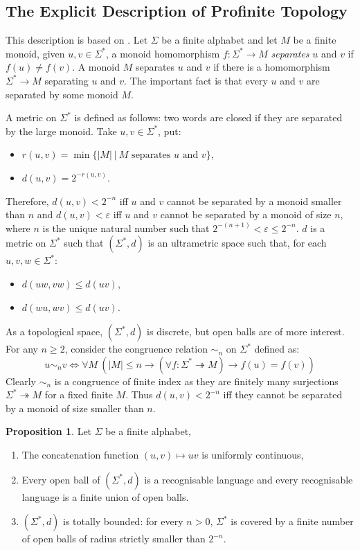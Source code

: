 \documentclass[8pt]{article}
\theoremstyle{definition}
\theoremstyle{definition}
\theoremstyle{definition}
\theoremstyle{definition}
\theoremstyle{definition}
\theoremstyle{definition}
\theoremstyle{definition}
\newtheorem{prop}{Proposition}[section]
\theoremstyle{definition}
\theoremstyle{definition}
\theoremstyle{definition}
\theoremstyle{definition}
\theoremstyle{definition}
\theoremstyle{definition}
\theoremstyle{definition}
\theoremstyle{question}
\begin{document}
\subsection{The Explicit Description of Profinite Topology}

This description is based on \cite[C.X.2]{pin2010mathematical}. Let $\Sigma$ be
a finite alphabet and let $M$ be a finite monoid, given $u, v \in \Sigma^*$,
a monoid homomorphism $f : \Sigma^* \to M$ \emph{separates} $u$ and $v$ if $f(u) \neq f(v)$. A monoid
$M$ separates $u$ and $v$ if there is a homomorphism $\Sigma^* \to M$ separating $u$ and $v$. The important 
fact is that every $u$ and $v$ are separated by some monoid $M$. 

A metric on $\Sigma^*$ is defined as follows: two words are closed if they are separated by the large monoid.
Take $u, v \in \Sigma^*$, put:
\begin{itemize}
  \item $r(u,v) = \min \{ |M| \: | \: \text{$M$ separates $u$ and $v$}\}$,
  \item $d(u, v) = 2^{-r(u,v)}$.
\end{itemize}
Therefore, $d(u,v) < 2^{-n}$ iff $u$ and $v$ cannot be separated by a monoid smaller than $n$
and $d(u,v) < \varepsilon$ iff $u$ and $v$ cannot be separated by a monoid of size $n$,
where $n$ is the unique natural number such that $2^{-(n+1)} < \varepsilon \leq 2^{-n}$.
$d$ is a metric on $\Sigma^{*}$ such that $(\Sigma^*, d)$ is an ultrametric space such that, for each 
$u, v, w \in \Sigma^*$:
\begin{itemize}
  \item $d(uw, vw) \leq d(uv)$,
  \item $d(wu, wv) \leq d(uv)$.
\end{itemize}
As a topological space, $(\Sigma^*, d)$ is discrete, but open balls are of more interest. For any $n \geq 2$,
consider the congruence relation $\sim_n$ on $\Sigma^*$ defined as:
\[
u \sim_n v \Leftrightarrow \forall M \: (|M| \leq n \rightarrow (\forall f : \Sigma^* \twoheadrightarrow M) \rightarrow f(u) = f(v))
\]
Clearly $\sim_n$ is a congruence of finite index as they are finitely many surjections $\Sigma^* \twoheadrightarrow M$
for a fixed finite $M$. Thus $d(u,v) < 2^{-n}$ iff they cannot be separated by a monoid of size smaller than $n$.

\begin{prop} Let $\Sigma$ be a finite alphabet,
\begin{enumerate}
  \item The concatenation function $(u,v) \mapsto uv$ is uniformly continuous,
  \item Every open ball of  $(\Sigma^*, d)$  is a recognisable language and every recognisable language is a finite union
  of open balls.
  \item $(\Sigma^*, d)$ is totally bounded: for every $n > 0$, $\Sigma^*$ is covered by a finite number
  of open balls of radius strictly smaller than $2^{-n}$.
\end{enumerate}
\end{prop}
\end{document}
